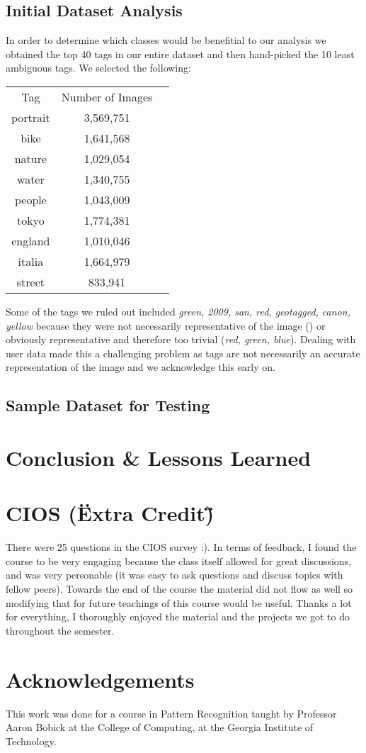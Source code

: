 \documentclass[conference]{acmsiggraph}
\begin{document}
\subsection{Initial Dataset Analysis}

In order to determine which classes would be benefitial to our analysis we obtained the top 40 tags in our entire dataset and then hand-picked the 10 least ambiguous tags. We selected the following:

\begin{tabular}{ c c c }
  Tag & Number of Images \\
  portrait & 3,569,751 \\
  bike & 1,641,568 \\
  nature & 1,029,054 \\
  water & 1,340,755 \\
  people & 1,043,009 \\
  tokyo & 1,774,381 \\
  england & 1,010,046 \\
  italia & 1,664,979 \\
  street & 833,941 \\
\end{tabular}

Some of the tags we ruled out included \textit{green, 2009, san, red, geotagged, canon, yellow} because they were not necessarily representative of the image () or obviously representative and therefore too trivial (\textit{red, green, blue}). Dealing with user data made this a challenging problem as tags are not necessarily an accurate representation of the image and we acknowledge this early on.

\subsection{Sample Dataset for Testing}


\section{Conclusion & Lessons Learned}

\section{CIOS (\"Extra Credit\")}
There were 25 questions in the CIOS survey :). In terms of feedback, I found the course to be very engaging because the class itself allowed for great discussions, and was very personable (it was easy to ask questions and discuss topics with fellow peers). Towards the end of the course the material did not flow as well so modifying that for future teachings of this course would be useful. Thanks a lot for everything, I thoroughly enjoyed the material and the projects we got to do throughout the semester.
\section*{Acknowledgements}

This work was done for a course in Pattern Recognition taught by Professor Aaron Bobick at the College of Computing, at the Georgia Institute of Technology.



\end{document}
